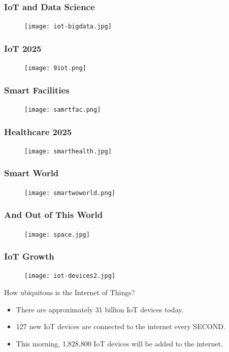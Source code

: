 \documentclass{beamer}
\begin{document}
\begin{frame}\frametitle{IoT and Data Science}
\begin{figure}[h]
	\begin{center}	
	\texttt{[image: iot-bigdata.jpg]}
	\end{center}
\end{figure}
\end{frame}

\begin{frame}\frametitle{IoT 2025}
\begin{figure}[h]
	\texttt{[image: 9iot.png]}	
\end{figure}
\end{frame}

\begin{frame}\frametitle{Smart Facilities}
\begin{figure}[h]
	\texttt{[image: samrtfac.png]}	
\end{figure}
\end{frame}

\begin{frame}\frametitle{Healthcare 2025}
\begin{figure}[h]
	\texttt{[image: smarthealth.jpg]}	
\end{figure}
\end{frame}

\begin{frame}\frametitle{Smart World}
\begin{figure}[h]
	\begin{center}	
	\texttt{[image: smartwoworld.png]}
	\end{center}
\end{figure}
\end{frame}

\begin{frame}\frametitle{And Out of This World}
\begin{figure}[h]
	\begin{center}	
	\texttt{[image: space.jpg]}
	\end{center}
\end{figure}
\end{frame}

\begin{frame}\frametitle{IoT Growth}
\begin{figure}[h]
	\begin{center}	
	\texttt{[image: iot-devices2.jpg]}
	\end{center}
\end{figure}

How ubiquitous is the Internet of Things?
\begin{itemize}
\item There are approximately 31 billion IoT devices today.
\item 127 new IoT devices are connected to the internet every SECOND.
\item This morning, 1,828,800 IoT devices will be added to the internet.
\end{itemize}



\end{frame}
\end{document}
